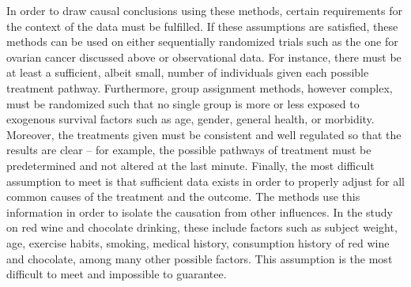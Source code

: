 In order to draw causal conclusions using these methods, certain requirements for the context of the data must be fulfilled.  If these assumptions are satisfied, these methods can be used on either sequentially randomized trials such as the one for ovarian cancer discussed above or observational data.  For instance, there must be at least a sufficient, albeit small, number of individuals given each possible treatment pathway.  Furthermore, group assignment methods, however complex, must be randomized such that no single group is more or less exposed to exogenous survival factors such as age, gender, general health, or morbidity.  Moreover, the treatments given must be consistent and well regulated so that the results are clear -- for example, the possible pathways of treatment must be predetermined and not altered at the last minute.  Finally, the most difficult assumption to meet is that sufficient data exists in order to properly adjust for all common causes of the treatment and the outcome.  The methods use this information in order to isolate the causation from other influences.  In the study on red wine and chocolate drinking, these include factors such as subject weight, age, exercise habits, smoking, medical history, consumption history of red wine and chocolate, among many other possible factors.  This assumption is the most difficult to meet and impossible to guarantee.  
  
